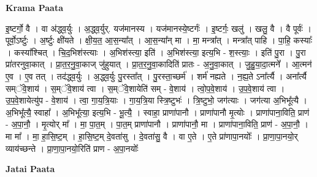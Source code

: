 \documentclass[17pt]{extarticle}
\begin{document}
\textbf{Krama Paata} \newline

इ॒ष्टर्गो॒ वै । वा अ॑द्ध्व॒र्युः । अ॒द्ध्व॒र्युर्. यज॑मानस्य । यज॑मानस्ये॒ष्टर्गः॑ । इ॒ष्टर्गः॒ खलु॑ । खलु॒ वै । वै पूर्वः॑ । पूर्वो॒ऽर्ष्टुः । अ॒र्ष्टुः क्षी॑यते । क्षी॒य॒त॒ आ॒स॒न्या᳚त् । आ॒स॒न्या᳚न् मा । मा॒ मन्त्रा᳚त् । मन्त्रा᳚त् पाहि । पा॒हि॒ कस्याः᳚ । कस्या᳚श्चित् । चि॒द॒भिश॑स्त्याः । अ॒भिश॑स्त्या॒ इति॑ । अ॒भिश॑स्त्या॒ इत्य॒भि - श॒स्त्याः॒ । इति॑ पु॒रा । पु॒रा प्रा॑तरनुवा॒कात् । प्रा॒त॒र॒नु॒वा॒काज् जु॑हुयात् । प्रा॒त॒र॒नु॒वा॒कादिति॑ प्रातः - अ॒नु॒वा॒कात् । जु॒हु॒या॒दा॒त्मने᳚ । आ॒त्मन॑ ए॒व । ए॒व तत् । तद॑द्ध्व॒र्युः । अ॒द्ध्व॒र्युः पु॒रस्ता᳚त् । पु॒रस्ता॒च्छर्म॑ । शर्म॑ नह्यते । न॒ह्य॒ते ऽना᳚र्त्यै । अना᳚र्त्यै सम्ॅवे॒शाय॑ । 
स॒म्ॅवे॒शाय॑ त्वा । स॒म्ॅवे॒शायेति॑ सम् - वे॒शाय॑ । त्वो॒प॒वे॒शाय॑ । उ॒प॒वे॒शाय॑ त्वा । उ॒प॒वे॒शायेत्यु॑प - वे॒शाय॑ । त्वा॒ गा॒य॒त्रि॒याः । गा॒य॒त्रि॒या स्त्रि॒ष्टुभः॑ । त्रि॒ष्टुभो॒ जग॑त्याः । जग॑त्या अ॒भिभू᳚त्यै । अ॒भिभू᳚त्यै॒ स्वाहा᳚ । अ॒भिभू᳚त्या॒ इत्य॒भि - भू॒त्यै॒ । स्वाहा॒ प्राणा॑पानौ । प्राणा॑पानौ मृ॒त्योः । प्राणा॑पाना॒विति॒ प्राण॑ - अ॒पा॒नौ॒ । मृ॒त्योर् मा᳚ । मा॒ पा॒त॒म् । पा॒त॒म् प्राणा॑पानौ । प्राणा॑पानौ॒ मा । प्राणा॑पाना॒विति॒ प्राण॑ - अ॒पा॒नौ॒ । मा मा᳚ । मा॒ हा॒सि॒ष्ट॒म् । हा॒सि॒ष्ट॒म् दे॒वता॑सु । दे॒वता॑सु॒ वै । वा ए॒ते । ए॒ते प्रा॑णापा॒नयोः᳚ । प्रा॒णा॒पा॒नयो॒र् व्याय॑च्छन्ते । प्रा॒णा॒पा॒नयो॒रिति॑ प्राण - अ॒पा॒नयोः᳚ \newline

\textbf{Jatai Paata} \newline
\end{document}
